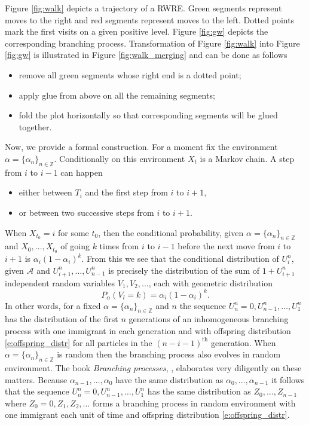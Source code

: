 \documentclass[12pt]{article}
\newcommand{\env}{\mathcal{A}}
\newcommand{\environ} {\alpha = \{ \alpha_n \}_{n\in \mathbb{Z} }}
\begin{document}
Figure \ref{fig:walk} depicts a trajectory of a RWRE. Green segments represent moves to the right and red segments represent moves to the left. Dotted points mark the first visits on a given positive level. Figure \ref{fig:gw} depicts the corresponding branching process. Transformation of Figure \ref{fig:walk} into Figure \ref{fig:gw} is illustrated in Figure \ref{fig:walk_merging} and can be done as follows
\begin{itemize}
    \item remove all green segments whose right end is a dotted point;
    \item apply glue from above on all the remaining segments;
    \item fold the plot horizontally so that corresponding segments will be glued together. 
\end{itemize}

\bigskip

Now, we provide a formal construction. For a moment fix the environment $\environ$. Conditionally on this environment $X_t$ is a Markov chain. A step from $i$ to $i-1$ can happen 
\begin{itemize}
    \item either between $T_i$ and the first step from $i$ to $i+1,$
    \item or between two successive steps from $i$ to $i+1.$
\end{itemize}
When $X_{t_0} = i$ for some $t_0$, then the conditional probability, given $\environ$ and $X_0, \dots , X_{t_0}$ of going $k$ times from $i$ to $i-1$ before the next move from $i$ to $i+1$ is $\alpha_i(1-\alpha_i)^k.$ From this we see that the conditional distribution of $U_i^n$, given $\env$ and $U_{i+1}^n, \dots, U_{n-1}^n$ is precisely the distribution of the sum of $1 + U_{i+1}^n$  independent random variables $V_1, V_2, \dots$, each with geometric distribution 
\begin{equation}\label{e:offspring_distr}
    P_\alpha(V_l = k) = \alpha_i(1-\alpha_i)^k.
\end{equation}
In other words, for a fixed $\environ$ and $n$ the sequence $U_n^n = 0, U_{n-1}^n, \dots, U_1^n$ has the distribution of the first $n$ generations of an inhomogeneous branching process with one immigrant in each generation and with offspring distribution  \eqref{e:offspring_distr} for all particles in the $(n-i-1)^\text{th}$ generation. When $\environ$ is random then the branching process also evolves in random environment. The book \textit{Branching processes}, \cite{BRANCHING}, elaborates very diligently on these matters. Because $\alpha_{n-1}, \dots, \alpha_0$ have the same distribution as $\alpha_0, \dots, \alpha_{n-1}$ it follows that the sequence $U_n^n = 0, U_{n-1}^n, \dots, U_1^n$ has the same distribution as $Z_0, \dots, Z_{n-1}$ where $Z_0 = 0, Z_1 , Z_2, \dots$ forms a branching process in random environment with one immigrant each unit of time and offspring distribution \eqref{e:offspring_distr}. 
\end{document}
